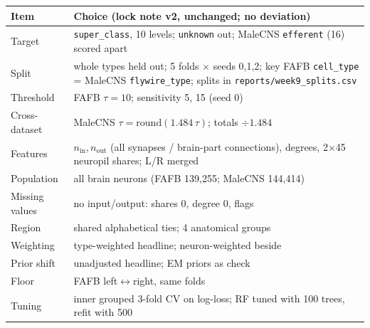 {\footnotesize
\begin{tabular}{@{}p{}p{}@{}}
\toprule
Item & Choice (lock note v2, unchanged; no deviation)\\
\midrule
Target & \texttt{super\_class}, 10 levels; \texttt{unknown} out; MaleCNS \texttt{efferent} (16) scored apart\\
Split & whole types held out; 5 folds $\times$ seeds 0,1,2; key FAFB \texttt{cell\_type} = MaleCNS \texttt{flywire\_type}; splits in \texttt{reports/week9\_splits.csv}\\
Threshold & FAFB $\tau=10$; sensitivity 5, 15 (seed 0)\\
Cross-dataset & MaleCNS $\tau=\mathrm{round}(1.484\,\tau)$; totals $\div 1.484$\\
Features & $n_{\text{in}}, n_{\text{out}}$ (all synapses / brain-part connections), degrees, 2$\times$45 neuropil shares; L/R merged\\
Population & all brain neurons (FAFB 139,255; MaleCNS 144,414)\\
Missing values & no input/output: shares 0, degree 0, flags\\
Region & shared alphabetical ties; 4 anatomical groups\\
Weighting & type-weighted headline; neuron-weighted beside\\
Prior shift & unadjusted headline; EM priors as check\\
Floor & FAFB left$\leftrightarrow$right, same folds\\
Tuning & inner grouped 3-fold CV on log-loss; RF tuned with 100 trees, refit with 500\\
\bottomrule
\end{tabular}}
